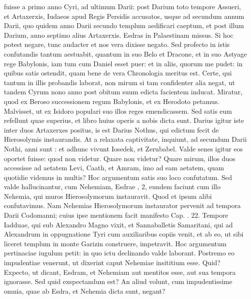 fuisse a primo anno Cyri, ad ultimum Darii: post Darium
toto tempore Assueri, et Artaxerxis, Iudaeos apud Regis Persidis
accusatos, usque ad secundum annum Darii, quo quidem anno
Darii secundo templum aedificari caeptum, et post illum Darium,
anno septimo alius Artaxerxis.
Esdras in Palaestinam missus.
Si hoc potest negare, tunc audacter et nos vera dixisse negato.
Sed profecto
in istis confutandis tantum aestuabit, quantum in suo Belo et
Dracone, et in suo Astyage rege Babylonis, iam tum cum Daniel
esset puer: et in aliis, quorum me pudet: in quibus satis ostendit,
quam bene de vera Chronologia meritus est.
Certe, qui tantum in
illis probandis laborat, non mirum si tam confidenter alia negat, ut
tandem Cyrum nono anno post obitum suum edicta facientem inducat.
Miratur, quod ex Beroso successionem regum Babylonis, et
ex Herodoto petamus. Malvisset, ut ex Isidoro populari suo illos
reges emendicassem.
%
Sed satis eum refellunt quae superius, et libro
 huius operis a nobis dicta sunt.
Darius igitur iste inter duos Artaxerxes
positus, is est Darius Nothus, qui edictum fecit de Hierosolymis
instaurandis.
At a relaxata captivitate, inquiunt, ad secundum
Darii Nothi, anni sunt : et adhunc vivunt Iosedek, et Zerubabel.
Valde senes igitur eos oportet fuisse: quod non videtur.
Quare non videtur?
Quare mirum, illos duos accessisse ad aetatem
Levi, Caath, et Amram, imo ad eam aetatem, quam quotidie videmus
in multis?
Hoc argumentum satis suo loco confutatum.
Sed
valde hallucinantur, cum Nehemiam, Esdrae , 2, eundem faciunt
cum illo Nehemia, qui muros Hierosolymorum instauravit.
Quod et ipsum alibi confutavimus.
Nam Nehemias Hierosolymorum
instaurator pervenit ad tempora Darii Codomanni;
cuius ipse mentionem facit manifesto Cap. . 22.
Tempore Iadduae,
qui sub Alexandro Magno vixit, et Sannaballetis Samaritani,
qui ad Alexandrum in oppugnatione Tyri cum auxiliaribus
copiis venit, et ab eo, ut sibi liceret templum in monte Garizin
construere, impetravit.
Hoc argumentum pertinaciae iugulum
petit: in quo ictu declinando valde laborant.
Postremo
eo impudentiae venerunt, ut dixerint caput  Nehemiae insititium
esse.
Quid?
Expecto, ut dicant, Esdram, et Nehemiam aut
mentitos esse, aut sua tempora ignorasse.
Sed quid exspectandum
est?
An aliud volunt, cum impudentissime omnia, quae ab Esdra,
et Nehemia dicta sunt, negant?
